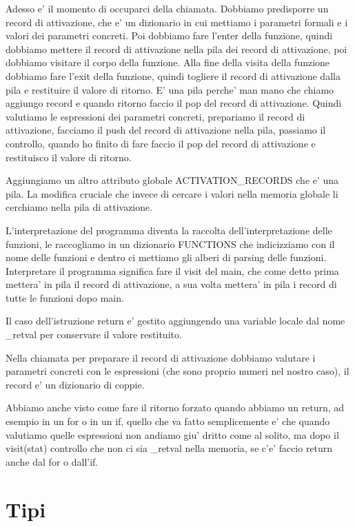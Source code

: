 Adesso e' il momento di occuparci della chiamata. Dobbiamo predisporre un record di attivazione, che e' un dizionario in cui mettiamo i parametri formali e i valori dei parametri concreti. Poi dobbiamo fare l'enter della funzione, quindi dobbiamo mettere il record di attivazione nella pila dei record di attivazione, poi dobbiamo visitare il corpo della funzione. Alla fine della visita della funzione dobbiamo fare l'exit della funzione, quindi togliere il record di attivazione dalla pila e restituire il valore di ritorno. E' una pila perche' man mano che chiamo aggiungo record e quando ritorno faccio il pop del record di attivazione. Quindi valutiamo le espressioni dei parametri concreti, prepariamo il record di attivazione, facciamo il push del record di attivazione nella pila, passiamo il controllo, quando ho finito di fare faccio il pop del record di attivazione e restituisco il valore di ritorno.

Aggiungiamo un altro attributo globale ACTIVATION\_RECORDS che e' una pila. La modifica cruciale che invece di cercare i valori nella memoria globale li cerchiamo nella pila di attivazione.

L'interpretazione del programma diventa la raccolta dell'interpretazione delle funzioni, le raccogliamo in un dizionario FUNCTIONS che indicizziamo con il nome delle funzioni e dentro ci mettiamo gli alberi di parsing delle funzioni.
Interpretare il programma significa fare il visit del main, che come detto prima mettera' in pila il record di attivazione, a sua volta mettera' in pila i record di tutte le funzioni dopo main.

Il caso dell'istruzione return e' gestito aggiungendo una variable locale dal nome \_retval per conservare il valore restituito.

Nella chiamata per preparare il record di attivazione dobbiamo valutare i parametri concreti con le espressioni (che sono proprio numeri nel nostro caso), il record e' un dizionario di coppie.

Abbiamo anche visto come fare il ritorno forzato quando abbiamo un return, ad esempio in un for o in un if, quello che va fatto semplicemente e' che quando valutiamo quelle espressioni non andiamo giu' dritto come al solito, ma dopo il visit(stat) controllo che non ci sia \_retval nella memoria, se c'e' faccio return anche dal for o dall'if.

\section{Tipi}


